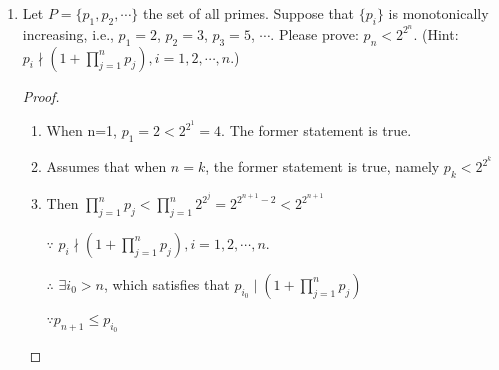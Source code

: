 \documentclass[12pt,a4paper]{article}
\theoremstyle{definition}
\begin{document}
\begin{enumerate}
\begin{proof}
        Then $\exists i_{n_0-1} \ge 0, j_{n_0-1} \ge 0$, such that $n_0-1= i_{n_0-1} \times 4 + j_{n_0-1} \times 7$.
        \begin{enumerate}
         
        \item
            $j_{n_0-1}=0$ 
            
            $\because n_0-1>17$ $\therefore i_{n_0-1}\ge5$.
            
            then $n_0=(i_{n_0-1}-5) \times 4 + 1 \times 7$, namely $\exists i_{n_0}=i_{n_0-1}-5,j_{n_0}=1$, such that $n_0 = i_{n_0} \times 4 + j_{n_0} \times 7$, which is objective to the assumption.
        \item 
            $j_{n_0-1}>0$
         \end{enumerate}    
            then $n_0=(i_{n_0-1}+2)\times4+(j_{n_0-1}-1)\times7$, namely $\exists i_{n_0}=i_{n_0-1}+2, j_{n_0}=j_{n_0-1}-1$, such that  $n_0 = i_{n_0} \times 4 + j_{n_0} \times 7$,which is also objective to the assumption.
            
        $\therefore$ for any integer $n>17$, there exist integers $i_n\ge 0$ and $j_n\ge 0$, such that $n = i_n \times 4 + j_n \times 7$.
        
    \end{proof}

    \item
    Let $P=\{p_1, p_2, \cdots\}$ the set of all primes. Suppose that $\{p_i\}$ is monotonically    increasing, i.e., $p_1=2$, $p_2=3$, $p_3=5$, $\cdots$. Please prove: $p_n<2^{2^n}$. {\color{blue}(Hint: $p_i \nmid (1+\prod_{j=1}^n p_j), i=1,2,\cdots,n$.)}
    \begin{proof}
    	\begin{enumerate}
    	    \item 
    	         When n=1, $p_1=2<2^{2^1}=4$. The former statement is true.
    	    \item 
    	        Assumes that when $n=k$, the former statement is true, namely $p_k<2^{2^k}$
    	    \item    
    	        Then $\prod_{j=1}^n p_j < \prod_{j=1}^n 2^{2^j}=2^{2^{n+1}-2}<2^{2^{n+1}} $
    	        
    	        $\because$ $p_i \nmid (1+\prod_{j=1}^n p_j), i=1,2,\cdots,n$.
    	        
    	        $\therefore$ $\exists i_0>n$, which satisfies that $p_{i_0} \mid (1+\prod_{j=1}^n p_j)$
    	        
    	        $\because p_{n+1}\le p_{i_0}$
    	        

\end{enumerate}
\end{proof}
\end{enumerate}
\end{document}
